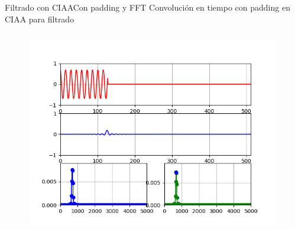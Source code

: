 \begin{frame}[t]{Filtrado con CIAA}{Con padding y FFT}
   \protoboardicon
   Convolución en tiempo con padding en CIAA para filtrado
   \begin{columns}[c]
      \hspace{2pt}
      \begin{column}{.3\textwidth}
         
      \end{column}
      \hspace{2pt}
      \vrule
      \hspace{2pt}
      \begin{column}{.3\textwidth}
         
      \end{column}
      \hspace{2pt}
      \vrule
      \hspace{2pt}
      \begin{column}{.4\textwidth}
         \includegraphics[width=0.9\textwidth]{5_clase/ciaa/psf2/conv1.png}
      \end{column}
      \hspace{2pt}
   \end{columns}
   \vfill
\end{frame}
